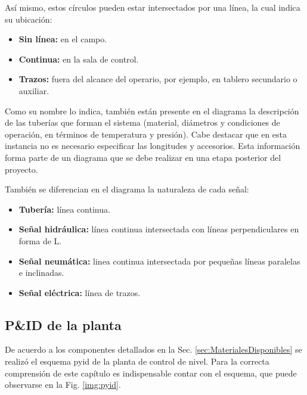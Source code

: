 Así mismo, estos círculos pueden estar intersectados por una línea, la
cual
indica su ubicación:

\begin{itemize}
 \item \textbf{Sin línea:} en el campo.
 \item \textbf{Continua:} en la sala de control.
 \item \textbf{Trazos:} fuera del alcance del operario, por ejemplo, en tablero
secundario o auxiliar.
\end{itemize}

Como su nombre lo indica, también están presente en el diagrama la descripción
de las tuberías que forman el sistema (material, diámetros y condiciones de
operación, en términos de temperatura y presión).
Cabe destacar que en esta instancia no es necesario especificar las
longitudes y accesorios.
Esta información forma parte de un diagrama que se debe realizar
en una etapa posterior del proyecto.

También se diferencian en el diagrama la naturaleza de cada señal:

\begin{itemize}
 \item \textbf{Tubería:} línea continua.
 \item \textbf{Señal hidráulica:} línea continua intersectada con líneas
perpendiculares en forma de L.
 \item \textbf{Señal neumática:} linea continua intersectada por pequeñas
líneas paralelas e inclinadas.
 \item \textbf{Señal eléctrica:} línea de trazos.
\end{itemize}

\subsection{P\&ID de la planta}
De acuerdo a los componentes detallados en la Sec.
\ref{sec:MaterialesDisponibles} se realizó el esquema \gls{pyid} de la planta
de control de nivel.
Para la correcta comprensión de este capítulo es indispensable contar con el
esquema, que puede observarse en la Fig. \ref{img:pyid}.

